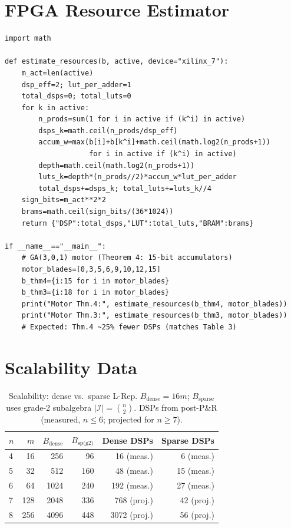 \documentclass[11pt,a4paper]{article}
\theoremstyle{definition}
\theoremstyle{plain}
\theoremstyle{remark}
\begin{document}
\section{FPGA Resource Estimator}
\label{app:dsp}

\begin{lstlisting}[caption={Corrected FPGA resource estimator},
  label=lst:fpga]
import math

def estimate_resources(b, active, device="xilinx_7"):
    m_act=len(active)
    dsp_eff=2; lut_per_adder=1
    total_dsps=0; total_luts=0
    for k in active:
        n_prods=sum(1 for i in active if (k^i) in active)
        dsps_k=math.ceil(n_prods/dsp_eff)
        accum_w=max(b[i]+b[k^i]+math.ceil(math.log2(n_prods+1))
                    for i in active if (k^i) in active)
        depth=math.ceil(math.log2(n_prods+1))
        luts_k=depth*(n_prods//2)*accum_w*lut_per_adder
        total_dsps+=dsps_k; total_luts+=luts_k//4
    sign_bits=m_act**2*2
    brams=math.ceil(sign_bits/(36*1024))
    return {"DSP":total_dsps,"LUT":total_luts,"BRAM":brams}

if __name__=="__main__":
    # GA(3,0,1) motor (Theorem 4: 15-bit accumulators)
    motor_blades=[0,3,5,6,9,10,12,15]
    b_thm4={i:15 for i in motor_blades}
    b_thm3={i:18 for i in motor_blades}
    print("Motor Thm.4:", estimate_resources(b_thm4, motor_blades))
    print("Motor Thm.3:", estimate_resources(b_thm3, motor_blades))
    # Expected: Thm.4 ~25% fewer DSPs (matches Table 3)
\end{lstlisting}

\section{Scalability Data}
\label{app:scale}

\begin{table}[h]
\centering
\caption{Scalability: dense vs.\ sparse L-Rep.
$B_\text{dense}=16m$; $B_\text{sparse}$ uses grade-2 subalgebra
$|\mathcal{I}|=\binom{n}{2}$.
DSPs from post-P\&R (measured, $n\le6$; projected for $n\ge7$).}
\label{tab:scale}
\begin{tabular}{lrrrrr}
\toprule
$n$ & $m$ & $B_\text{dense}$ & $B_\text{sp(g2)}$ & Dense DSPs & Sparse DSPs \\
\midrule
4 & 16 & 256 & 96 & 16 (meas.) & 6 (meas.) \\
5 & 32 & 512 & 160 & 48 (meas.) & 15 (meas.) \\
6 & 64 & 1024 & 240 & 192 (meas.) & 27 (meas.) \\
7 & 128 & 2048 & 336 & 768 (proj.) & 42 (proj.) \\
8 & 256 & 4096 & 448 & 3072 (proj.) & 56 (proj.) \\
\bottomrule
\end{tabular}
\end{table}
\end{document}

